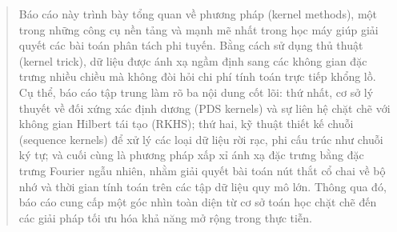 \begin{abstract}
Báo cáo này trình bày tổng quan về phương pháp  (kernel methods),
một trong những công cụ nền tảng và mạnh mẽ nhất trong học máy giúp giải quyết
các bài toán phân tách phi tuyến. Bằng cách sử dụng thủ thuật 
(kernel trick), dữ liệu được ánh xạ ngầm định sang các không gian đặc trưng
nhiều chiều mà không đòi hỏi chi phí tính toán trực tiếp khổng lồ. Cụ thể, báo
cáo tập trung làm rõ ba nội dung cốt lõi: thứ nhất, cơ sở lý thuyết về
 đối xứng xác định dương (PDS kernels) và sự liên hệ chặt chẽ với
không gian Hilbert  tái tạo (RKHS); thứ hai, kỹ thuật thiết kế
 chuỗi (sequence kernels) để xử lý các loại dữ liệu rời rạc, phi cấu
trúc như chuỗi ký tự; và cuối cùng là phương pháp xấp xỉ ánh xạ  đặc
trưng bằng đặc trưng Fourier ngẫu nhiên, nhằm giải quyết bài toán nút thắt cổ
chai về bộ nhớ và thời gian tính toán trên các tập dữ liệu quy mô lớn.  Thông
qua đó, báo cáo cung cấp một góc nhìn toàn diện từ cơ sở toán học chặt chẽ đến
các giải pháp tối ưu hóa khả năng mở rộng trong thực tiễn.
\end{abstract}
